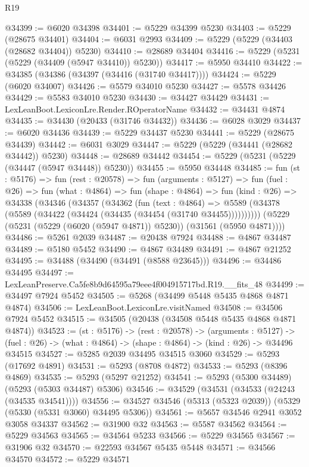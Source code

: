 \begin{lexlean}{R19}
\begin{coremodule}
@34399 := @6020 @34398
@34401 := @5229 @34399 @5230
@34403 := @5229 (@28675 @34401)
@34404 := @6031 @2993
@34409 := @5229 (@5229 (@34403 (@28682 @34404)) @5230)
@34410 := @28689 @34404
@34416 := @5229 (@5231 (@5229 (@34409 (@5947 @34410)) @5230))
@34417 := @5950 @34410
@34422 := @34385 (@34386 (@34397 (@34416 (@31740 @34417))))
@34424 := @5229 (@6020 @34007)
@34426 := @5579 @34010 @5230
@34427 := @5578 @34426
@34429 := @5583 @34010 @5230
@34430 := @34427 @34429
@34431 := LexLeanBoot.LexiconLre.Render.ROperatorName
@34432 := @34431 @4874
@34435 := @34430 (@20433 (@31746 @34432))
@34436 := @6028 @3029
@34437 := @6020 @34436
@34439 := @5229 @34437 @5230
@34441 := @5229 (@28675 @34439)
@34442 := @6031 @3029
@34447 := @5229 (@5229 (@34441 (@28682 @34442)) @5230)
@34448 := @28689 @34442
@34454 := @5229 (@5231 (@5229 (@34447 (@5947 @34448)) @5230))
@34455 := @5950 @34448
@34485 := fun (st : @5176) =>
  fun (rest : @20578) =>
  fun (arguments : @5127) =>
  fun (fuel : @26) =>
  fun (what : @4864) =>
  fun (shape : @4864) =>
  fun (kind : @26) =>
  @34338
    (@34346
      (@34357
        (@34362
          (fun (text : @4864) =>
          @5589 (@34378 (@5589 (@34422 (@34424 (@34435 (@34454 (@31740 @34455))))))))))
      (@5229 (@5231 (@5229 (@6020 (@5947 @4871)) @5230)) (@31561 (@5950 @4871))))
@34486 := @5261 @2039
@34487 := @20438 @7924
@34488 := @4867 @34487
@34489 := @5180 @5452
@34490 := @4867 @34489
@34491 := @4867 @21252
@34495 := @34488 (@34490 (@34491 (@8588 @23645)))
@34496 := @34486 @34495
@34497 := LexLeanPreserve.Ca5fe8b9d64595a79eee4f004915717bd.R19.__fits_48
@34499 := @34497 @7924 @5452
@34505 := @5268 (@34499 @5448 @5435 @4868 @4871 @4874)
@34506 := LexLeanBoot.LexiconLre.visitNamed
@34508 := @34506 @7924 @5452
@34515 := @34505 (@20438 (@34508 @5448 @5435 @4868 @4871 @4874))
@34523 := (st : @5176) ->
  (rest : @20578) ->
  (arguments : @5127) ->
  (fuel : @26) -> (what : @4864) -> (shape : @4864) -> (kind : @26) -> @34496 @34515
@34527 := @5285 @2039 @34495 @34515 @3060
@34529 := @5293 (@17692 @4891)
@34531 := @5293 (@8708 @4872)
@34533 := @5293 (@8396 @4869)
@34535 := @5293 (@5297 @21252)
@34541 := @5293 (@5300 @34489) (@5293 (@5303 @34487) @5306)
@34546 := @34529 (@34531 (@34533 (@24243 (@34535 @34541))))
@34556 := @34527 @34546 (@5313 (@5323 @2039)) (@5329 (@5330 (@5331 @3060) @34495 @5306))
@34561 := @5657 @34546 @2941 @3052 @3058 @34337
@34562 := @31900 @32
@34563 := @5587 @34562
@34564 := @5229 @34563
@34565 := @34564 @5233
@34566 := @5229 @34565
@34567 := @31906 @32
@34570 := @22593 @34567 @5435 @5448
@34571 := @34566 @34570
@34572 := @5229 @34571

\end{coremodule}
\end{lexlean}
